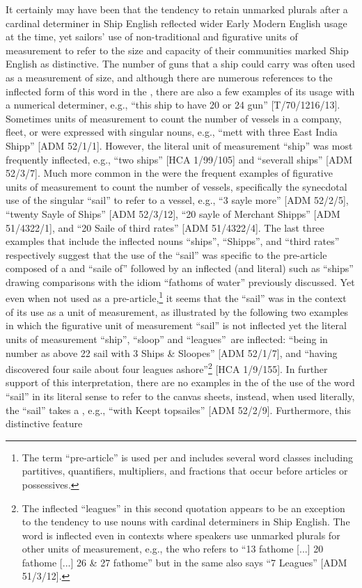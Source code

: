 It certainly may have been that the tendency to retain unmarked plurals after a cardinal determiner in Ship English reflected wider Early Modern English usage at the time, yet sailors’ use of non-traditional and figurative units of measurement to refer to the size and capacity of their communities marked Ship English as distinctive. The number of guns that a ship could carry was often used as a measurement of size, and although there are numerous references to the inflected form of this word in the , there are also a few examples of its  usage with a numerical determiner, e.g., “this ship to have 20 or 24 gun” [T/70/1216/13]. Sometimes units of measurement to count the number of vessels in a company, fleet, or  were expressed with singular nouns, e.g., “mett with three East India Shipp” [ADM 52/1/1]. However, the literal unit of measurement “ship” was most frequently inflected, e.g., “two ships” [HCA 1/99/105] and “severall ships” [ADM 52/3/7]. Much more common in the  were the frequent examples of  figurative units of measurement to count the number of vessels, specifically the synecdotal use of the singular  “sail” to refer to a vessel, e.g., “3 sayle more” [ADM 52/2/5], “twenty Sayle of Ships” [ADM 52/3/12], “20 sayle of Merchant Shipps” [ADM 51/4322/1], and “20 Saile of third rates” [ADM 51/4322/4]. The last three examples that include the inflected nouns “ships”, “Shipps”, and “third rates” respectively suggest that the use of the  “sail” was specific to the pre-article composed of a  and “saile of” followed by an inflected (and literal)  such as “ships” drawing comparisons with the idiom “fathoms of water” previously discussed. Yet even when not used as a pre-article,\footnote{The term “pre-article” is used per \citet[76]{Morenberg2010} and includes several word classes including partitives, quantifiers, multipliers, and fractions that occur before articles or possessives.} it seems that the  “sail” was  in the context of its use as a unit of measurement, as illustrated by the following two examples in which the figurative unit of measurement “sail” is not inflected yet the literal units of measurement “ship”, “sloop” and “leagues”~are inflected: “being in number as above 22 sail with 3  Ships \& Sloopes” [ADM 52/1/7], and “having discovered four saile about four leagues ashore”\footnote{The inflected  “leagues” in this second quotation appears to be an exception to the tendency to use  nouns with cardinal determiners in Ship English. The word is inflected even in contexts where speakers use unmarked plurals for other units of measurement, e.g., the  who refers to “13 fathome [...] 20 fathome [...] 26 \& 27 fathome” but in the same  also says “7 Leagues” [ADM 51/3/12].} [HCA 1/9/155]. In further support of this interpretation, there are no examples in the  of the  use of the word “sail” in its literal sense to refer to the  canvas sheets, instead, when used literally, the  “sail” takes a , e.g., “with Keept topsailes” [ADM 52/2/9]. Furthermore, this distinctive feature 